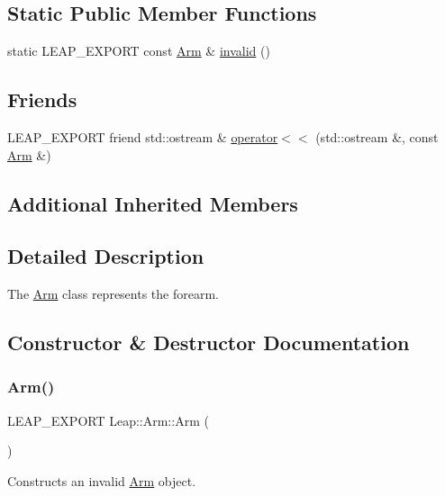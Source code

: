 \subsection*{Static Public Member Functions}
\begin{DoxyCompactItemize}
\item 
static L\+E\+A\+P\+\_\+\+E\+X\+P\+O\+RT const \hyperlink{class_leap_1_1_arm}{Arm} \& \hyperlink{class_leap_1_1_arm_aa7d54cfc4620732197439757a38bacce}{invalid} ()
\end{DoxyCompactItemize}
\subsection*{Friends}
\begin{DoxyCompactItemize}
\item 
L\+E\+A\+P\+\_\+\+E\+X\+P\+O\+RT friend std\+::ostream \& \hyperlink{class_leap_1_1_arm_a619b9b7c78e6103c73f6519b817abbf5}{operator$<$$<$} (std\+::ostream \&, const \hyperlink{class_leap_1_1_arm}{Arm} \&)
\end{DoxyCompactItemize}
\subsection*{Additional Inherited Members}


\subsection{Detailed Description}
The \hyperlink{class_leap_1_1_arm}{Arm} class represents the forearm. 

\subsection{Constructor \& Destructor Documentation}
\mbox{\label{class_leap_1_1_arm_a06812410f5051730fcd3f1e050e76a22}} 
\subsubsection{\texorpdfstring{Arm()}{Arm()}}
{\footnotesize\ttfamily L\+E\+A\+P\+\_\+\+E\+X\+P\+O\+RT Leap\+::\+Arm\+::\+Arm (\begin{DoxyParamCaption}{ }\end{DoxyParamCaption})}

Constructs an invalid \hyperlink{class_leap_1_1_arm}{Arm} object.

